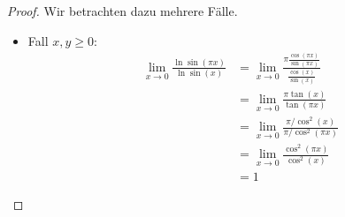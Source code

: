 \begin{proof}
Wir betrachten dazu mehrere Fälle.
\begin{itemize}
	\item Fall $x,y \ge 0$: \\
\begin{align*}
    \lim_
    {
    x\to 0
    }\frac{\ln\sin
    \left( \pi x \right)}
    {{\ln\sin\left(x\right) 
    }}
    &= \lim_{x \to 0} \frac{\pi \frac{\cos(\pi x)}{\sin\left(\pi x\right)}}{\frac{\cos\left( x\right)}{\sin\left(x\right)}} \\
    &= \lim_{x \to 0} \frac{\pi \tan\left(x\right)}{\tan\left(\pi x\right)} \\
    &= \lim_{x \to 0} \frac{\pi / \cos^2\left(x\right)}{\pi / \cos^2\left(\pi x\right)} \\
    &= \lim_{x \to 0} \frac{\cos^2\left(\pi x\right)}{\cos^2\left(x\right)} \\
    &= 1
\end{align*}	
\end{itemize}
\end{proof}
